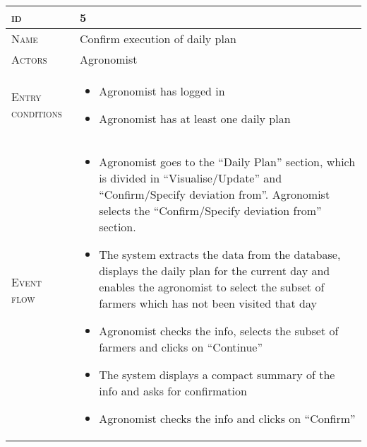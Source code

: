 

\begin{table}[H]
    \centering
    \begin{tabular}[c]{|l|p{}|}
        \hline %
    	\textsc{id}                 &   5\\
    	\hline %
    	\textsc{Name}               &   Confirm execution of daily plan\\
    	\hline %
    	\textsc{Actors}             &   Agronomist\\
    	\hline %
    	\textsc{Entry conditions}   &   \begin{itemize}
                                    	    \item Agronomist has logged in
                                    	    \item Agronomist has at least one daily plan
                                        \end{itemize}\\
    	\hline %
    	\textsc{Event flow}         &   \footnotesize
            	                        \begin{itemize}
                                    	    \item Agronomist goes to the “Daily Plan” section, which is divided in “Visualise/Update” and “Confirm/Specify deviation from”. Agronomist selects the “Confirm/Specify deviation from” section.
                                    		\item The system extracts the data from the database, displays the daily plan for the current day and enables the agronomist to select the subset of farmers which has not been visited that day
                                            \item Agronomist checks the info, selects the subset of farmers and clicks on “Continue”
                                            \item The system displays a compact summary of the info and asks for confirmation
                                            \item Agronomist checks the info and clicks on “Confirm”


\end{itemize}
\end{tabular}
\end{table}
